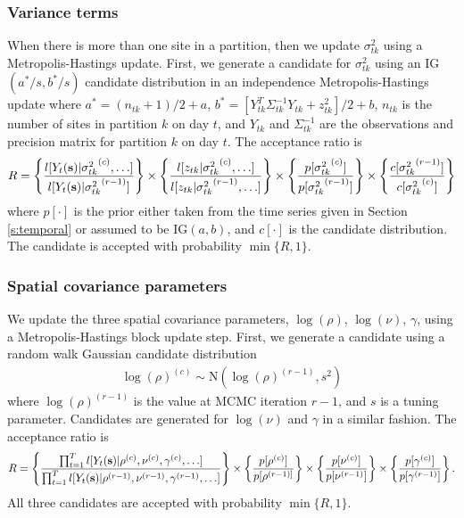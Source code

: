 \documentclass[11pt]{article}
\begin{document}
\subsubsection*{Variance terms}
When there is more than one site in a partition, then we update $\sigma^2_{tk}$ using a Metropolis-Hastings update.
First, we generate a candidate for $\sigma^2_{tk}$ using an IG$(a^*/s, b^*/s)$ candidate distribution in an independence Metropolis-Hastings update where $a^* = (n_{tk} + 1) / 2 + a$, $b^* = [Y_{tk}^T \Sigma^{-1}_{tk} Y_{tk} + z_{tk}^2] / 2 + b$, $n_{tk}$ is the number of sites in partition $k$ on day $t$, and $Y_{tk}$ and $\Sigma^{-1}_{tk}$ are the observations and precision matrix for partition $k$ on day $t$.
The acceptance ratio is
\begin{align*}
  R = \left\{
    \frac{ l[Y_t(\mbox{\bf s}) | {\sigma^2_{tk}}^{(c)}, \ldots] }
         { l[Y_t(\mbox{\bf s}) | {\sigma^2_{tk}}^{(r - 1)}]}
    \right\} \times \left\{
    \frac{ l[z_{tk} | {\sigma^2_{tk}}^{(c)}, \ldots] }
         { l[z_{tk} | {\sigma^2_{tk}}^{(r - 1)}, \ldots] }
    \right\} \times \left\{
    \frac{ p[ {\sigma^2_{tk}}^{(c)} ] }
         { p[ {\sigma^2_{tk}}^{(r - 1)}] }
    \right\} \times \left\{
    \frac{ c[ {\sigma^2_{tk}}^{(r - 1)}] }
         { c[ {\sigma^2_{tk}}^{(c)}]}
    \right\}
\end{align*}
where $p[\cdot]$ is the prior either taken from the time series given in Section \ref{s:temporal} or assumed to be IG$(a, b)$, and $c[\cdot]$ is the candidate distribution.
The candidate is accepted with probability $\min\{R, 1\}$.

\subsubsection*{Spatial covariance parameters}
We update the three spatial covariance parameters, $\log(\rho)$, $\log(\nu)$, $\gamma$, using a Metropolis-Hastings block update step.
First, we generate a candidate using a random walk Gaussian candidate distribution
\begin{align*}
	\log(\rho)^{(c)} \sim \text{N}(\log(\rho)^{(r - 1)}, s^2)
\end{align*}
where $\log(\rho)^{(r-1)}$ is the value at MCMC iteration $r - 1$, and $s$ is a tuning parameter.
Candidates are generated for $\log(\nu)$ and $\gamma$ in a similar fashion.
The acceptance ratio is
\begin{align*}
	R = \left\{ \frac{ \prod_{t = 1}^{T} l[Y_t(\mbox{\bf s}) | \rho^{(c)}, \nu^{(c)}, \gamma^{(c)}, \ldots] }{\prod_{t = 1}^{T} l[Y_t(\mbox{\bf s}) | \rho^{(r-1)}, \nu^{(r-1)}, \gamma^{(r-1)}, \ldots] } \right\} \times \left\{ \frac{ p[\rho^{(c)}] }{ p[\rho^{(r - 1)] } } \right\} \times \left\{ \frac{ p[\nu^{(c)}] }{ p[\nu^{(r - 1)}] } \right\} \times \left\{ \frac{ p[ \gamma^{(c)} ] }{ p[\gamma^{(r - 1)} ] } \right\}.
\end{align*}
All three candidates are accepted with probability $\min\{R, 1\}$.
\end{document}

